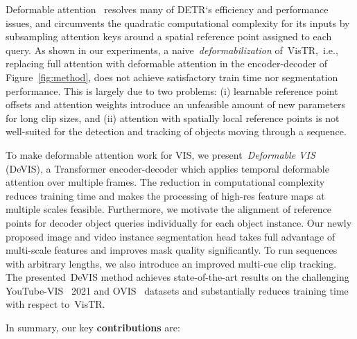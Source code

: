 \documentclass[runningheads]{llncs}
\newcommand{\detr}{\mbox{DETR}}
\newcommand{\vistr}{\mbox{VisTR}}
\newcommand{\evis}{\mbox{DeVIS}}
\newcommand{\ie}{i.e.}
\begin{document}
Deformable attention~\cite{deformable_detr} resolves many of \detr{}`s efficiency and performance issues, and circumvents the quadratic computational complexity for its inputs by subsampling attention keys around a spatial reference point assigned to each query.
As shown in our experiments, a naive~\textit{deformabilization} of~\vistr{},~\ie, replacing full attention with deformable attention in the encoder-decoder of Figure~\ref{fig:method}, does not achieve satisfactory train time nor segmentation performance.
This is largely due to two problems: (i) learnable reference point offsets and attention weights introduce an unfeasible amount of new parameters for long clip sizes, and (ii) attention with spatially local reference points is not well-suited for the detection and tracking of objects moving through a sequence.


To make deformable attention work for VIS, we present~\textit{Deformable VIS} (\evis{}), a Transformer encoder-decoder which applies temporal deformable attention over multiple frames.
The reduction in computational complexity reduces training time and makes the processing of high-res feature maps at multiple scales feasible.
Furthermore, we motivate the alignment of reference points for decoder object queries individually for each object instance.
Our newly proposed image and video instance segmentation head takes full advantage of multi-scale features and improves mask quality significantly.
To run sequences with arbitrary lengths, we also introduce an improved multi-cue clip tracking.
The presented~\evis{} method achieves state-of-the-art results on the challenging YouTube-VIS~\cite{Yang2019vis} 2021 and OVIS~\cite{ovis} datasets and substantially reduces training time with respect to~\vistr{}.



In summary, our key \textbf{contributions} are:
\end{document}
